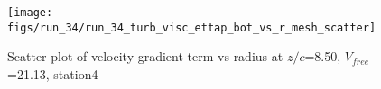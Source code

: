 \begin{figure}[H]
\centering
\texttt{[image: figs/run\_34/run\_34\_turb\_visc\_ettap\_bot\_vs\_r\_mesh\_scatter]}
\caption{Scatter plot of velocity gradient term vs radius at $z/c$=8.50, $V_{free}$=21.13, station4}
\label{fig:run_34_turb_visc_ettap_bot_vs_r_mesh_scatter}
\end{figure}


